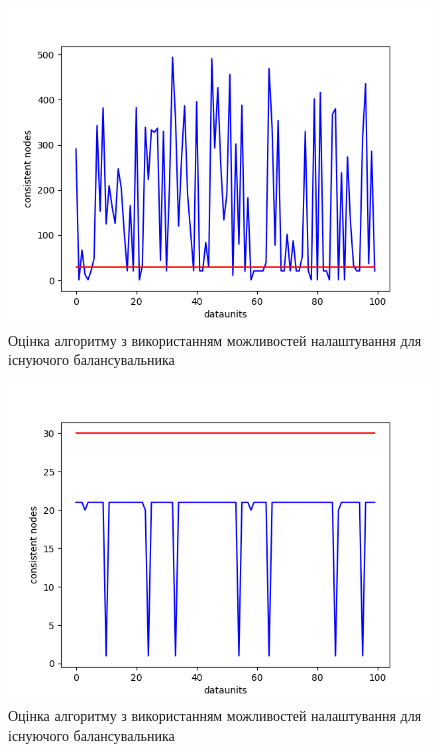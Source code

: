 \documentclass[14pt]{vakthesis}
\begin{document}


\begin{figure}
\centering

\includegraphics[width=\linewidth]{images/lb_haproxy_configuration/w_10_r_500.png}

     \caption{Оцінка алгоритму з використанням можливостей налаштування для існуючого балансувальника}
     \label{fig:lb_haproxy_config_10}
\end{figure}

\begin{figure}
\centering

\includegraphics[width=\linewidth]{images/lb_haproxy_configuration/w_100_r_500.png}

     \caption{Оцінка алгоритму з використанням можливостей налаштування для існуючого балансувальника}
     \label{fig:lb_haproxy_config_100}
\end{figure}
\end{document}
